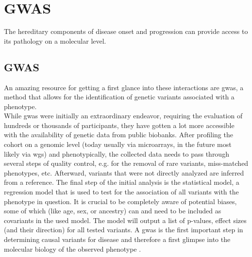     \section{GWAS}
    \label{sec:gwas}
    The hereditary components of disease onset and progression can provide access to its pathology on a molecular level.

    \subsection{GWAS}
    \label{subsec:gwas_general}
    An amazing resource for getting a first glance into these interactions are \ac{gwas}, a method that allows for the identification of genetic variants associated with a phenotype.\\
    While \ac{gwas} were initially an extraordinary endeavor, requiring the evaluation of hundreds or thousands of participants, they have gotten a lot more accessible with the availability of genetic data from public biobanks. After profiling the cohort on a genomic level (today usually via microarrays, in the future most likely via \ac{wgs}) and phenotypically, the collected data needs to pass through several steps of quality control, e.g. for the removal of rare variants, miss-matched phenotypes, etc. Afterward, variants that were not directly analyzed are inferred from a reference. The final step of the initial analysis is the statistical model, a regression model that is used to test for the association of all variants with the phenotype in question. It is crucial to be completely aware of potential biases, some of which (like age, sex, or ancestry) can and need to be included as covariants in the used model. \cite{uffelmannGenomewideAssociationStudies2021, flintGWAS2013} The model will output a list of p-values, effect sizes (and their direction) for all tested variants. A \ac{gwas} is the first important step in determining causal variants for disease and therefore a first glimpse into the molecular biology of the observed phenotype \cite{uffelmannGenomewideAssociationStudies2021}.

